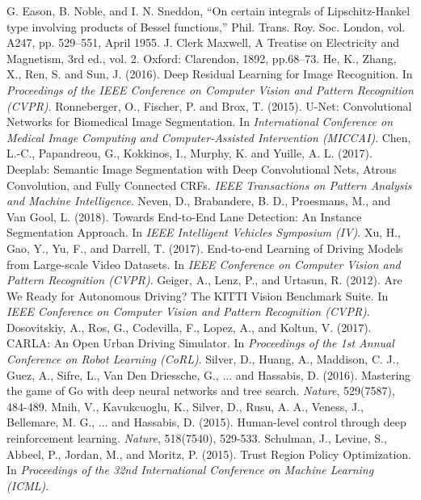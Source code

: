 \documentclass[conference]{IEEEtran}
\begin{document}
\begin{thebibliography}{00}

 G. Eason, B. Noble, and I. N. Sneddon, ``On certain integrals of Lipschitz-Hankel type involving products of Bessel functions,'' Phil. Trans. Roy. Soc. London, vol. A247, pp. 529--551, April 1955.
 J. Clerk Maxwell, A Treatise on Electricity and Magnetism, 3rd ed., vol. 2. Oxford: Clarendon, 1892, pp.68--73.
\bibitem He, K., Zhang, X., Ren, S. and Sun, J. (2016). Deep Residual Learning for Image Recognition. In \textit{Proceedings of the IEEE Conference on Computer Vision and Pattern Recognition (CVPR)}.
\bibitem Ronneberger, O., Fischer, P. and Brox, T. (2015). U-Net: Convolutional Networks for Biomedical Image Segmentation. In \textit{International Conference on Medical Image Computing and Computer-Assisted Intervention (MICCAI)}.
\bibitem Chen, L.-C., Papandreou, G., Kokkinos, I., Murphy, K. and Yuille, A. L. (2017). Deeplab: Semantic Image Segmentation with Deep Convolutional Nets, Atrous Convolution, and Fully Connected CRFs. \textit{IEEE Transactions on Pattern Analysis and Machine Intelligence}.
\bibitem Neven, D., Brabandere, B. D., Proesmans, M., and Van Gool, L. (2018). Towards End-to-End Lane Detection: An Instance Segmentation Approach. In \textit{IEEE Intelligent Vehicles Symposium (IV)}.
\bibitem Xu, H., Gao, Y., Yu, F., and Darrell, T. (2017). End-to-end Learning of Driving Models from Large-scale Video Datasets. In \textit{IEEE Conference on Computer Vision and Pattern Recognition (CVPR)}.
\bibitem Geiger, A., Lenz, P., and Urtasun, R. (2012). Are We Ready for Autonomous Driving? The KITTI Vision Benchmark Suite. In \textit{IEEE Conference on Computer Vision and Pattern Recognition (CVPR)}.
\bibitem Dosovitskiy, A., Ros, G., Codevilla, F., Lopez, A., and Koltun, V. (2017). CARLA: An Open Urban Driving Simulator. In \textit{Proceedings of the 1st Annual Conference on Robot Learning (CoRL)}.
\bibitem Silver, D., Huang, A., Maddison, C. J., Guez, A., Sifre, L., Van Den Driessche, G., ... and Hassabis, D. (2016). Mastering the game of Go with deep neural networks and tree search. \textit{Nature}, 529(7587), 484-489.
\bibitem Mnih, V., Kavukcuoglu, K., Silver, D., Rusu, A. A., Veness, J., Bellemare, M. G., ... and Hassabis, D. (2015). Human-level control through deep reinforcement learning. \textit{Nature}, 518(7540), 529-533.
\bibitem Schulman, J., Levine, S., Abbeel, P., Jordan, M., and Moritz, P. (2015). Trust Region Policy Optimization. In \textit{Proceedings of the 32nd International Conference on Machine Learning (ICML)}.

\end{thebibliography}
\end{document}
